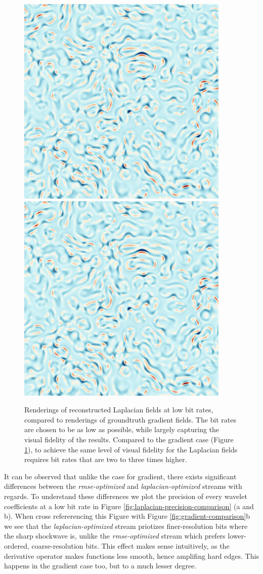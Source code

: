 \begin{figure}[h]
	{\includegraphics[width=0.24\linewidth]{img/laplacian/diffusivity-laplacian.png}}
	{\includegraphics[width=0.24\linewidth]{img/laplacian/diffusivity-groundtruth-laplacian.png}}
	\caption{Renderings of reconstructed Laplacian fields at low bit rates, compared to renderings of groundtruth gradient fields. The bit rates are chosen to be as low as possible, while largely capturing the visual fidelity of the results. Compared to the gradient case (Figure \ref{fig:gradient-rendering}), to achieve the same level of visual fidelity for the Laplacian fields requires bit rates that are two to three times higher.}
  \label{fig:gradient-rendering}
\end{figure}

It can be observed that unlike the case for gradient, there exists significant differences between
the \emph{rmse-optimized} and \emph{laplacian-optimized} streams with regards. To understand these
differences we plot the precision of every wavelet coefficients at a low bit rate in Figure
\ref{fig:laplacian-precision-comparison} (a and b). When cross refererencing this Figure with Figure
\ref{fig:gradient-comparison}b we see that the \emph{laplacian-optimized} stream priotizes
finer-resolution bits where the sharp shockwave is, unlike the \emph{rmse-optimized} stream which
prefers lower-ordered, coarse-resolution bits. This effect makes sense intuitively, as the
derivative operator makes functions less smooth, hence amplifing hard edges. This happens in the
gradient case too, but to a much lesser degree.

